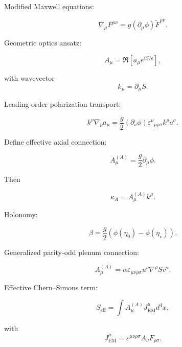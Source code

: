 \documentclass[12pt]{article}
\begin{document}
Modified Maxwell equations:

\begin{equation}
\nabla_\mu F^{\mu\nu}
=
g
(\partial_\mu \phi)
\tilde{F}^{\mu\nu}.
\end{equation}

Geometric optics ansatz:

\begin{equation}
A_\mu = \Re \left[ a_\mu e^{i S/\epsilon} \right],
\end{equation}

with wavevector
\begin{equation}
k_\mu = \partial_\mu S.
\end{equation}

Leading-order polarization transport:

\begin{equation}
k^\nu \nabla_\nu a_\mu
=
\frac{g}{2}
(\partial_\nu \phi)
\varepsilon^{\nu}{}_{\mu\rho\sigma}
k^\rho a^\sigma.
\end{equation}

Define effective axial connection:

\begin{equation}
A_\mu^{(A)}
=
\frac{g}{2}
\partial_\mu \phi.
\end{equation}

Then

\begin{equation}
\kappa_A
=
A_\mu^{(A)} k^\mu.
\end{equation}

Holonomy:

\begin{equation}
\beta
=
\frac{g}{2}
\left(
\phi(\eta_0)
-
\phi(\eta_\star)
\right).
\end{equation}

Generalized parity-odd plenum connection:

\begin{equation}
A_\mu^{(A)}
=
\alpha
\varepsilon_{\mu\nu\rho\sigma}
u^\nu
\nabla^\rho S
v^\sigma.
\end{equation}

Effective Chern--Simons term:

\begin{equation}
S_{\mathrm{eff}}
=
\int
A_\mu^{(A)} J^\mu_{\mathrm{EM}}
d^4x,
\end{equation}

with
\begin{equation}
J^\mu_{\mathrm{EM}}
=
\varepsilon^{\mu\nu\rho\sigma}
A_\nu F_{\rho\sigma}.
\end{equation}
\end{document}
